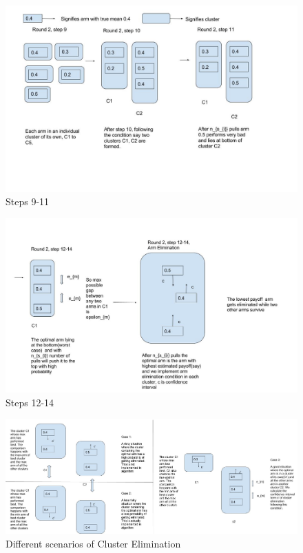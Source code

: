 \begin{figure}[!tbp]
\centering
\includegraphics[scale=0.4]{img/diag1.jpg}
\caption{Steps 9-11}
\end{figure}
\begin{figure}[!tbp]
\includegraphics[scale=0.4]{img/diag2.jpg}
\caption{Steps 12-14}
\end{figure}
\begin{figure}[!tbp]
\includegraphics[scale=0.25]{img/diag3.jpg}
\caption{Different scenarios of Cluster Elimination}
\end{figure}




